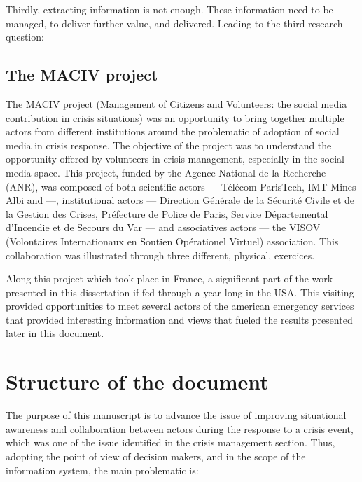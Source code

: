 Thirdly, extracting information is not enough.
These information need to be managed, to deliver further value, and delivered.
Leading to the third research question:

\begin{center}
\end{center}

\subsection{The MACIV project}
The MACIV project (Management of Citizens and Volunteers: the social media contribution in crisis situations)
was an opportunity to bring together multiple actors from different institutions around the problematic
of adoption of social media in crisis response.
The objective of the project was to understand the opportunity offered by volunteers in crisis management, especially in the social media space.
This project, funded by the Agence National de la Recherche (ANR), was composed of both
scientific actors — Télécom ParisTech, IMT Mines Albi and —,
institutional actors — Direction Générale de la Sécurité Civile et de la Gestion des Crises, Préfecture de Police de Paris, Service Départemental d'Incendie et de Secours du Var — and
associatives actors — the VISOV (Volontaires Internationaux en Soutien Opérationel Virtuel) association.
This collaboration was illustrated through three different, physical, exercices.

Along this project which took place in France, a significant part of the work presented in this dissertation if fed through a year long in the USA.
This visiting provided opportunities to meet several actors of the american emergency services that
provided interesting information and views that fueled the results presented later in this document.

\section{Structure of the document}
The purpose of this manuscript is to advance the issue of improving situational awareness and collaboration between actors during the response to a crisis event, which was one of the issue identified in the crisis management section.
Thus, adopting the point of view of decision makers, and in the scope of the information system, the main problematic is:

